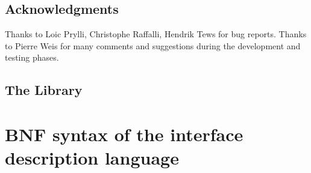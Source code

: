 \section*{Acknowledgments}
Thanks to Loic Prylli, Christophe Raffalli, Hendrik Tews for bug reports.
Thanks to Pierre Weis for many comments and suggestions during the
development and testing phases.





\begin{htmlonly}
\chapter{The Library}
\end{htmlonly}



\appendix
\chapter{BNF syntax of the interface description language}


